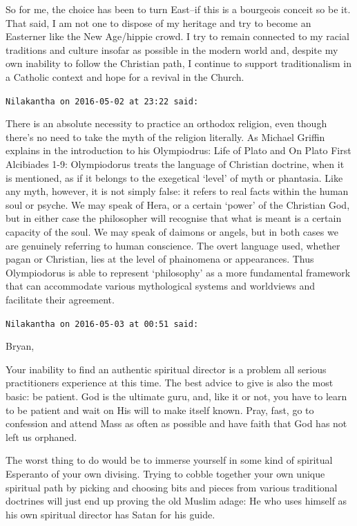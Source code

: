 \begin{footnotesize}
\begin{sffamily}
So for me, the choice has been to turn East--if this is a bourgeois conceit so be it. That said, I am not one to dispose of my heritage and try to become an Easterner like the New Age/hippie crowd. I try to remain connected to my racial traditions and culture insofar as possible in the modern world and, despite my own inability to follow the Christian path, I continue to support traditionalism in a Catholic context and hope for a revival in the Church.

\hfill

\texttt{Nilakantha on 2016-05-02 at 23:22 said:}

There is an absolute necessity to practice an orthodox religion, even though there's no need to take the myth of the religion literally. As Michael Griffin explains in the introduction to his Olympiodrus: Life of Plato and On Plato First Alcibiades 1-9: Olympiodorus treats the language of Christian doctrine, when it is mentioned, as if it belongs to the exegetical `level' of myth or phantasia. Like any myth, however, it is not simply false: it refers to real facts within the human soul or psyche. We may speak of Hera, or a certain `power' of the Christian God, but in either case the philosopher will recognise that what is meant is a certain capacity of the soul. We may speak of daimons or angels, but in both cases we are genuinely referring to human conscience. The overt language used, whether pagan or Christian, lies at the level of phainomena or appearances. Thus Olympiodorus is able to represent `philosophy' as a more fundamental framework that can accommodate various mythological systems and worldviews and facilitate their agreement.

\hfill

\texttt{Nilakantha on 2016-05-03 at 00:51 said:}

Bryan,

Your inability to find an authentic spiritual director is a problem all serious practitioners experience at this time. The best advice to give is also the most basic: be patient. God is the ultimate guru, and, like it or not, you have to learn to be patient and wait on His will to make itself known. Pray, fast, go to confession and attend Mass as often as possible and have faith that God has not left us orphaned.

The worst thing to do would be to immerse yourself in some kind of spiritual Esperanto of your own divising. Trying to cobble together your own unique spiritual path by picking and choosing bits and pieces from various traditional doctrines will just end up proving the old Muslim adage: He who uses himself as his own spiritual director has Satan for his guide.


\end{sffamily}
\end{footnotesize}
